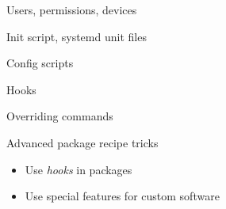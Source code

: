 \begin{frame}{Users, permissions, devices}


\end{frame}

\begin{frame}{Init script, systemd unit files}


\end{frame}

\begin{frame}{Config scripts}


\end{frame}

\begin{frame}{Hooks}

\end{frame}

\begin{frame}{Overriding commands}

\end{frame}

\setuplabframe
{Advanced package recipe tricks}
{
  \begin{itemize}
  \item Use {\em hooks} in packages
  \item Use special features for custom software
  \end{itemize}
}
